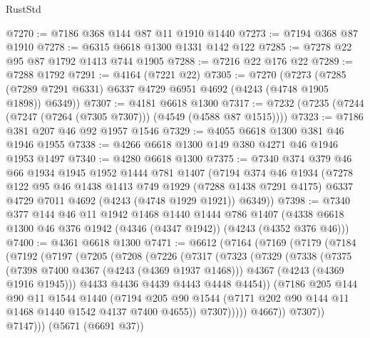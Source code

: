 \begin{lexlean}{RustStd}
\begin{coremodule}
@7270 := @7186 @368 @144 @87 @11 @1910 @1440
@7273 := @7194 @368 @87 @1910
@7278 := @6315 @6618 @1300 @1331 @142 @122
@7285 := @7278 @22 @95 @87 @1792 @1413 @744 @1905
@7288 := @7216 @22 @176 @22
@7289 := @7288 @1792
@7291 := @4164 (@7221 @22)
@7305 := @7270
    (@7273 (@7285 (@7289 @7291 @6331) @6337 @4729 @6951 @4692 (@4243 (@4748 @1905 @1898)) @6349))
@7307 := @4181 @6618 @1300
@7317 := @7232 (@7235 (@7244 (@7247 (@7264 (@7305 @7307))) (@4549 (@4588 @87 @1515))))
@7323 := @7186 @381 @207 @46 @92 @1957 @1546
@7329 := @4055 @6618 @1300 @381 @46 @1946 @1955
@7338 := @4266 @6618 @1300 @149 @380 @4271 @46 @1946 @1953 @1497
@7340 := @4280 @6618 @1300
@7375 := @7340
    @374
    @379
    @46
    @66
    @1934
    @1945
    @1952
    @1444
    @781
    @1407
    (@7194
      @374
      @46
      @1934
      (@7278
        @122
        @95
        @46
        @1438
        @1413
        @749
        @1929
        (@7288 @1438 @7291 @4175)
        @6337
        @4729
        @7011
        @4692
        (@4243 (@4748 @1929 @1921))
        @6349))
@7398 := @7340
    @377
    @144
    @46
    @11
    @1942
    @1468
    @1440
    @1444
    @786
    @1407
    (@4338 @6618 @1300 @46 @376 @1942 (@4346 (@4347 @1942)) (@4243 (@4352 @376 @46)))
@7400 := @4361 @6618 @1300
@7471 := @6612
    (@7164
      (@7169
        (@7179
          (@7184
            (@7192
              (@7197
                (@7205
                  (@7208
                    (@7226
                      (@7317
                        (@7323
                          (@7329
                            (@7338
                              (@7375
                                (@7398 @7400 @4367 (@4243 (@4369 @1937 @1468)))
                                @4367
                                (@4243 (@4369 @1916 @1945)))
                              @4433
                              @4436
                              @4439
                              @4443
                              @4448
                              @4454))
                          (@7186
                            @205
                            @144
                            @90
                            @11
                            @1544
                            @1440
                            (@7194
                              @205
                              @90
                              @1544
                              (@7171 @202 @90 @144 @11 @1468 @1440 @1542 @4137 @7400 @4655))
                            @7307)))))
                  @4667))
              @7307))
          @7147)))
    (@5671 (@6691 @37))

\end{coremodule}
\end{lexlean}

